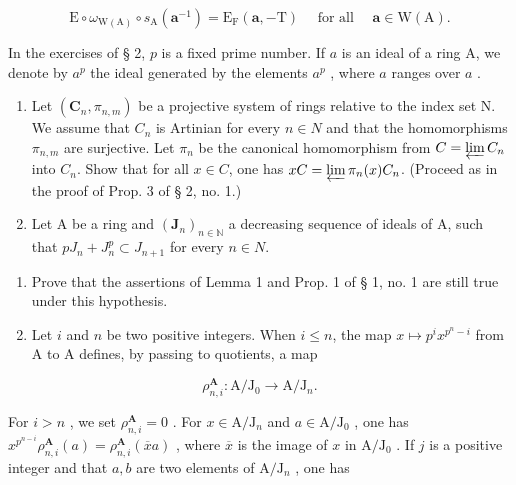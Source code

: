 \[
\mathrm{E} \circ \omega_ {\mathrm{W(A)}} \circ s _ {\mathrm{A}} (\boldsymbol {a} ^ {- 1}) = \mathrm{E} _ {\mathrm{F}} (\boldsymbol {a}, - \mathrm{T}) \quad \text { for all } \quad \boldsymbol {a} \in \mathrm{W(A)}.
\]


In the exercises of § 2, \(p\) is a fixed prime number. If \(a\) is an ideal of a ring A, we denote by \(a^p\) the ideal generated by the elements \(a^p\) , where \(a\) ranges over \(a\) .

\begin{enumerate}
\def\labelenumi{\arabic{enumi})}
\item
  Let \((\mathbf{C}_{n}, \pi_{n,m})\) be a projective system of rings relative to the index set N. We assume that \(C_{n}\) is Artinian for every \(n \in N\) and that the homomorphisms \(\pi_{n,m}\) are surjective. Let \(\pi_{n}\) be the canonical homomorphism from \(C = \varprojlim C_{n}\) into \(C_{n}\). Show that for all \(x \in C\), one has \(xC = \varprojlim \pi_{n}(x) C_{n}\). (Proceed as in the proof of Prop. 3 of § 2, no. 1.)
\item
  Let A be a ring and \((\mathbf{J}_{n})_{n\in\mathbb{N}}\) a decreasing sequence of ideals of A, such that \(pJ_{n} + J_{n}^{p} \subset J_{n+1}\) for every \(n \in N\).
\end{enumerate}

\begin{enumerate}
\def\labelenumi{\alph{enumi})}
\item
  Prove that the assertions of Lemma 1 and Prop. 1 of § 1, no. 1 are still true under this hypothesis.
\item
  Let \(i\) and \(n\) be two positive integers. When \(i \leqslant n\), the map \(x \mapsto p^i x^{p^n - i}\) from A to A defines, by passing to quotients, a map
\end{enumerate}

\[
\rho_ {n, i} ^ {\mathbf {A}}: \mathrm{A} / \mathrm{J} _ {0} \rightarrow \mathrm{A} / \mathrm{J} _ {n}.
\]

For \(i > n\) , we set \(\rho_{n,i}^{\mathbf{A}} = 0\) . For \(x \in \mathrm{A} / \mathrm{J}_n\) and \(a \in \mathrm{A} / \mathrm{J}_0\) , one has \(x^{p^{n - i}} \rho_{n,i}^{\mathbf{A}}(a) = \rho_{n,i}^{\mathbf{A}}(\overline{x} a)\) , where \(\overline{x}\) is the image of \(x\) in \(\mathrm{A} / \mathrm{J}_0\) . If \(j\) is a positive integer and that \(a, b\) are two elements of \(\mathrm{A} / \mathrm{J}_n\) , one has

